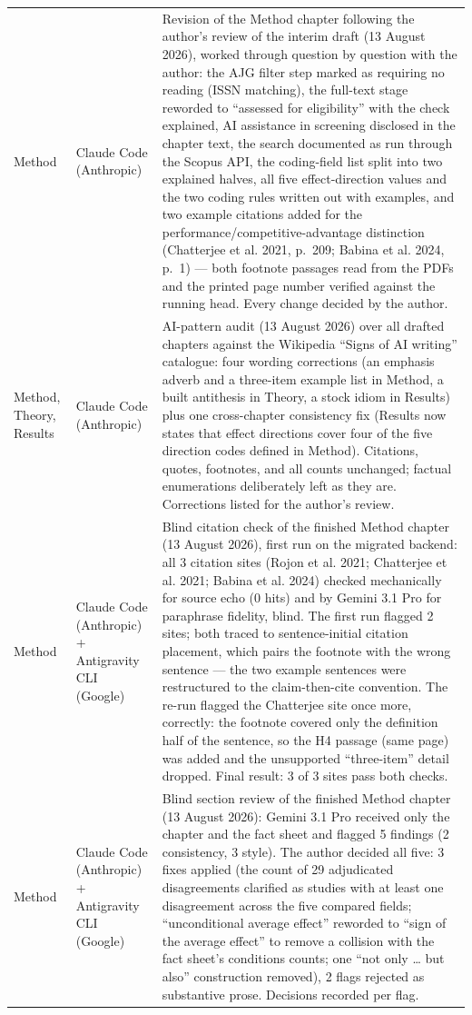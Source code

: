 \begin{longtable}{@{}p{2.9cm}p{3.2cm}p{9.0cm}@{}}
Method & Claude Code (Anthropic) & Revision of the Method chapter following the author's review of the interim draft (13 August 2026), worked through question by question with the author: the AJG filter step marked as requiring no reading (ISSN matching), the full-text stage reworded to ``assessed for eligibility'' with the check explained, AI assistance in screening disclosed in the chapter text, the search documented as run through the Scopus API, the coding-field list split into two explained halves, all five effect-direction values and the two coding rules written out with examples, and two example citations added for the performance/competitive-advantage distinction (Chatterjee et al. 2021, p.~209; Babina et al. 2024, p.~1) --- both footnote passages read from the PDFs and the printed page number verified against the running head. Every change decided by the author. \\
\addlinespace
Method, Theory, Results & Claude Code (Anthropic) & AI-pattern audit (13 August 2026) over all drafted chapters against the Wikipedia ``Signs of AI writing'' catalogue: four wording corrections (an emphasis adverb and a three-item example list in Method, a built antithesis in Theory, a stock idiom in Results) plus one cross-chapter consistency fix (Results now states that effect directions cover four of the five direction codes defined in Method). Citations, quotes, footnotes, and all counts unchanged; factual enumerations deliberately left as they are. Corrections listed for the author's review. \\
\addlinespace
Method & Claude Code (Anthropic) + Antigravity CLI (Google) & Blind citation check of the finished Method chapter (13 August 2026), first run on the migrated backend: all 3 citation sites (Rojon et al. 2021; Chatterjee et al. 2021; Babina et al. 2024) checked mechanically for source echo (0 hits) and by Gemini 3.1 Pro for paraphrase fidelity, blind. The first run flagged 2 sites; both traced to sentence-initial citation placement, which pairs the footnote with the wrong sentence --- the two example sentences were restructured to the claim-then-cite convention. The re-run flagged the Chatterjee site once more, correctly: the footnote covered only the definition half of the sentence, so the H4 passage (same page) was added and the unsupported ``three-item'' detail dropped. Final result: 3 of 3 sites pass both checks. \\
\addlinespace
Method & Claude Code (Anthropic) + Antigravity CLI (Google) & Blind section review of the finished Method chapter (13 August 2026): Gemini 3.1 Pro received only the chapter and the fact sheet and flagged 5 findings (2 consistency, 3 style). The author decided all five: 3 fixes applied (the count of 29 adjudicated disagreements clarified as studies with at least one disagreement across the five compared fields; ``unconditional average effect'' reworded to ``sign of the average effect'' to remove a collision with the fact sheet's conditions counts; one ``not only \ldots{} but also'' construction removed), 2 flags rejected as substantive prose. Decisions recorded per flag. \\

\end{longtable}
